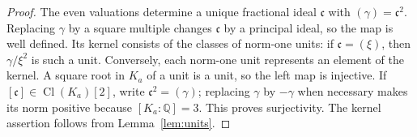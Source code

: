 \documentclass[draft]{publmathdeb}
\theoremstyle{remark}
\numberwithin{equation}{section}
\newcommand{\Q}{\mathbb Q}
\DeclareMathOperator{\Cl}{Cl}
\begin{document}
\begin{proof}
  The even valuations determine a unique fractional ideal $\mathfrak c$ with $(\gamma)=\mathfrak c^2$. Replacing $\gamma$ by a square multiple changes $\mathfrak c$ by a principal ideal, so the map is well defined. Its kernel consists of the classes of norm-one units: if $\mathfrak c=(\xi)$, then $\gamma/\xi^2$ is such a unit. Conversely, each norm-one unit represents an element of the kernel. A square root in ${K_{a}}$ of a unit is a unit, so the left map is injective. If $[\mathfrak c]\in\Cl({K_{a}})[2]$, write $\mathfrak c^2=(\gamma)$; replacing $\gamma$ by $-\gamma$ when necessary makes its norm positive because $[{K_{a}}:\Q]=3$. This proves surjectivity. The kernel assertion follows from Lemma~\ref{lem:units}.
\end{proof}
\end{document}
